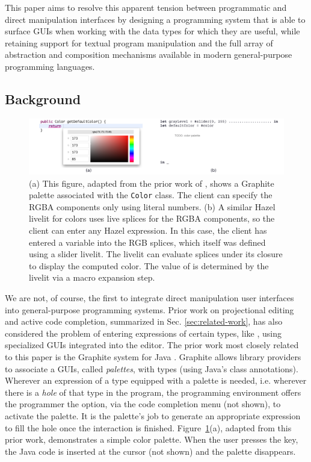 This paper aims to resolve this apparent tension between 
programmatic and direct manipulation interfaces by designing a programming system that 
is able to surface GUIs when working with the data types for which 
they are useful, while retaining support for textual program manipulation  
and the full array of abstraction and composition mechanisms
available in modern general-purpose programming languages.

\subsection{Background}
\begin{figure}
  \begin{center}
  \includegraphics[width=35pc]{color-palettes.png}\end{center}
  \caption{
  (a) This figure, adapted from the prior work of \citet{Graphite}, 
  shows a Graphite palette associated with the \texttt{Color} class. 
  The client can specify the RGBA components only using literal numbers. 
  (b) A similar Hazel livelit for colors uses live splices for the RGBA components,
  so the client can enter any Hazel expression. 
  In this case, the client has entered a variable into the RGB 
  splices, which itself was defined using a slider livelit. 
  The livelit can evaluate splices under its closure to display the 
  computed color. 
  The value of  is determined by the livelit via a macro expansion step.}
  \label{fig:color}
\end{figure}

We are not, of course, the first to integrate direct manipulation user interfaces
into general-purpose programming systems.
Prior work on projectional editing
and active code completion, summarized in Sec. \ref{sec:related-work}, 
has also considered the problem of entering expressions 
of certain types, like , 
using specialized GUIs integrated into the editor. 
The prior work most closely related to this paper is the {Graphite} system for Java \cite{Graphite}.
Graphite allows library providers to associate a GUIs, called \emph{palettes}, with types (using Java's class annotations). 
Wherever an expression of a type equipped with a palette is needed, 
i.e. wherever there is a \emph{hole} of that type in the program, 
the programming environment offers the programmer the option, via the code completion menu (not shown), 
to activate the palette. 
It is the palette's job to generate an 
appropriate expression to fill the hole once the interaction is finished. 
Figure~\ref{fig:color}(a), adapted from this prior work, demonstrates a simple color palette.
When the user presses the  key, the Java code  is inserted at the cursor (not shown) and the palette disappears.

